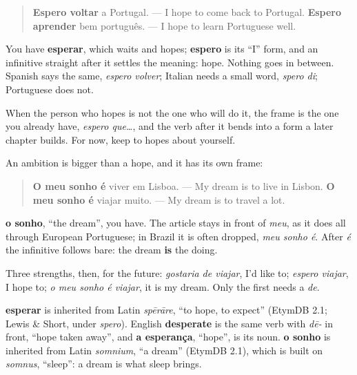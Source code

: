 \begin{quote}
\textbf{Espero voltar} a Portugal. — I hope to come back to Portugal. \textbf{Espero aprender} bem português. — I hope to learn Portuguese well.
\end{quote}

You have \textbf{esperar}, which waits and hopes; \textbf{espero} is its \textquotedblleft{}I\textquotedblright{} form, and an infinitive straight after it settles the meaning: hope. Nothing goes in between. Spanish says the same, \emph{espero volver}; Italian needs a small word, \emph{spero di}; Portuguese does not.

When the person who hopes is not the one who will do it, the frame is the one you already have, \emph{espero que…}, and the verb after it bends into a form a later chapter builds. For now, keep to hopes about yourself.

\begin{grammarlens}[title={Grammar Lens: o meu sonho é}]
An ambition is bigger than a hope, and it has its own frame:

\begin{quote}
\textbf{O meu sonho é} viver em Lisboa. — My dream is to live in Lisbon. \textbf{O meu sonho é} viajar muito. — My dream is to travel a lot.
\end{quote}

\textbf{o sonho}, \textquotedblleft{}the dream\textquotedblright{}, you have. The article stays in front of \emph{meu}, as it does all through European Portuguese; in Brazil it is often dropped, \emph{meu sonho é}. After \emph{é} the infinitive follows bare: the dream \textbf{is} the doing.

Three strengths, then, for the future: \emph{gostaria de viajar}, I'd like to; \emph{espero viajar}, I hope to; \emph{o meu sonho é viajar}, it is my dream. Only the first needs a \emph{de}.
\end{grammarlens}

\begin{cousinweb}
\textbf{esperar} is inherited from Latin \emph{spērāre}, \textquotedblleft{}to hope, to expect\textquotedblright{} (EtymDB 2.1; Lewis \& Short, under \emph{spero}). English \textbf{desperate} is the same verb with \emph{dē-} in front, \textquotedblleft{}hope taken away\textquotedblright{}, and \textbf{a esperança}, \textquotedblleft{}hope\textquotedblright{}, is its noun. \textbf{o sonho} is inherited from Latin \emph{somnium}, \textquotedblleft{}a dream\textquotedblright{} (EtymDB 2.1), which is built on \emph{somnus}, \textquotedblleft{}sleep\textquotedblright{}: a dream is what sleep brings.
\end{cousinweb}

